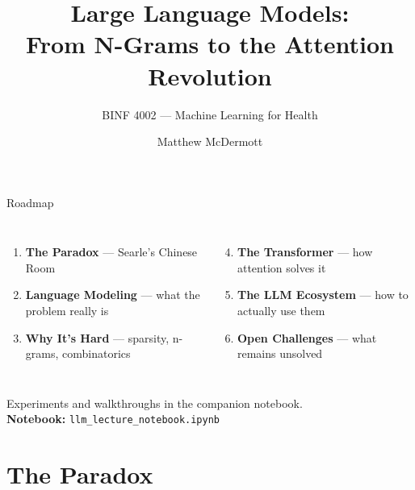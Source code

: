 \documentclass[aspectratio=169, 10pt]{beamer}
\title{Large Language Models:\\From N-Grams to the Attention Revolution}
\subtitle{BINF 4002 --- Machine Learning for Health}
\author{Matthew McDermott}
\institute{Department of Biomedical Informatics, Columbia University}
\date{}
\begin{document}

\maketitle

\begin{frame}{Roadmap}

\begin{columns}[T]
\begin{enumerate}
  \item \textbf{The Paradox} --- Searle's Chinese Room
  \item \textbf{Language Modeling} --- what the problem really is
  \item \textbf{Why It's Hard} --- sparsity, n-grams, combinatorics
\end{enumerate}

\begin{enumerate}\setcounter{enumi}{3}
  \item \textbf{The Transformer} --- how attention solves it
  \item \textbf{The LLM Ecosystem} --- how to actually use them
  \item \textbf{Open Challenges} --- what remains unsolved
\end{enumerate}
\end{columns}

\vspace{10pt}
\begin{center}
\small Experiments and walkthroughs in the companion notebook.\\
\textcolor{AccentOrange}{} \textbf{Notebook:} \texttt{llm\_lecture\_notebook.ipynb}
\end{center}

\end{frame}

\section{The Paradox}
\end{document}

